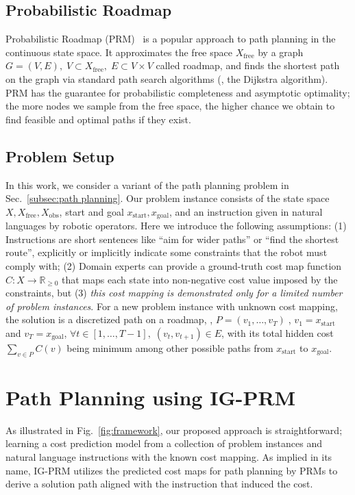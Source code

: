 \subsection{Probabilistic Roadmap}
Probabilistic Roadmap (PRM)~\cite{kavraki1996probabilistic,karaman2011sampling} is a popular approach to path planning in the continuous state space. It approximates the free space $X_{\text{free}}$ by a graph $G=(V, E),\; V\subset X_{\text{free}},\; E\subset V\times V$ called roadmap, and finds the shortest path on the graph via standard path search algorithms (\eg, the Dijkstra algorithm). PRM has the guarantee for probabilistic completeness and asymptotic optimality; the more nodes we sample from the free space, the higher chance we obtain to find feasible and optimal paths if they exist.

\subsection{Problem Setup}
In this work, we consider a variant of the path planning problem in Sec.~\ref{subsec:path planning}. Our problem instance consists of the state space $X, X_{\text{free}}, X_{\text{obs}}$, start and goal $x_{\text{start}}, x_{\text{goal}}$, and an instruction given in natural languages by robotic operators. Here we introduce the following assumptions: (1) Instructions are short sentences like ``aim for wider paths'' or ``find the shortest route'', explicitly or implicitly indicate some constraints that the robot must comply with; (2) Domain experts can provide a ground-truth cost map function $C: X\rightarrow \mathbb{R}_{\geq 0}$ that maps each state into non-negative cost value imposed by the constraints, but (3) \emph{this cost mapping is demonstrated only for a limited number of problem instances}. For a new problem instance with unknown cost mapping, the solution is a discretized path on a roadmap, \ie, $P=(v_1,\dots,v_T)\;$, $v_1=x_{\text{start}}$ and $v_T=x_{\text{goal}}$, $\forall t \in [1,\dots, T-1],\;(v_t, v_{t+1})\in E$, with its total hidden cost $\sum_{v\in P} C(v)$ being minimum among other possible paths from $x_{\text{start}}$ to $x_{\text{goal}}$.
 
\section{Path Planning using IG-PRM}
As illustrated in Fig.~\ref{fig:framework}, our proposed approach is straightforward; learning a cost prediction model from a collection of problem instances and natural language instructions with the known cost mapping. As implied in its name, IG-PRM utilizes the predicted cost maps for path planning by PRMs to derive a solution path aligned with the instruction that induced the cost.

